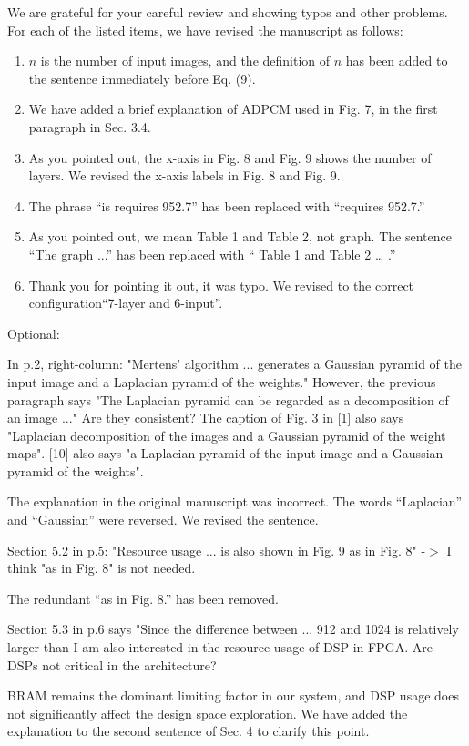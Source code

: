 \documentclass[a4j]{jsarticle}
\begin{document}
\noindent
We are grateful for your careful review and showing typos and
other problems. For each of the listed items, we have revised
the manuscript as follows:
\begin{enumerate}
  \item $\mathit{n}$ is the number of input images, and the definition of $\mathit{n}$ has been added to the sentence immediately before Eq. (9).
  \item We have added a brief explanation of ADPCM used in Fig. 7, in the first paragraph in Sec. 3.4.
  \item As you pointed out, the x-axis in Fig. 8 and Fig. 9 shows the number of layers. We revised the x-axis labels in Fig. 8 and Fig. 9.
  \item The phrase “is requires 952.7” has been replaced with “requires 952.7.”
  \item As you pointed out, we mean Table 1 and Table 2, not graph. The sentence “The graph ...” has been replaced with “ Table 1 and Table 2 … .” 
  \item Thank you for pointing it out, it was typo. We revised to the correct configuration``7-layer and 6-input''.
\end{enumerate}

\begin{screen}
Optional:

In p.2, right-column: "Mertens' algorithm ... generates a Gaussian pyramid of the input image and a Laplacian pyramid of the weights."
However, the previous paragraph says "The Laplacian pyramid can be regarded as a decomposition of an image ..."
Are they consistent?
The caption of Fig. 3 in [1] also says "Laplacian decomposition of the images and a Gaussian pyramid of the weight maps".
[10] also says "a Laplacian pyramid of the input image and a Gaussian pyramid of the weights".
\end{screen}
The explanation in the original manuscript was incorrect. 
The words ``Laplacian'' and ``Gaussian'' were reversed. 
We revised the sentence.

\vspace{0.3cm}
\begin{screen}
Section 5.2 in p.5: "Resource usage ... is also shown in Fig. 9 as in Fig. 8"
-$>$ I think "as in Fig. 8" is not needed.
\end{screen}
The redundant “as in Fig. 8.” has been removed.

\vspace{0.3cm}
\begin{screen}
Section 5.3 in p.6 says "Since the difference between ... 912 and 1024 is relatively larger than
I am also interested in the resource usage of DSP in FPGA. Are DSPs not critical in the architecture?
\end{screen}
BRAM remains the dominant limiting factor in our system, and DSP usage does not significantly affect the design space exploration.
We have added the explanation to the second sentence of Sec. 4 to clarify this point.
\end{document}

